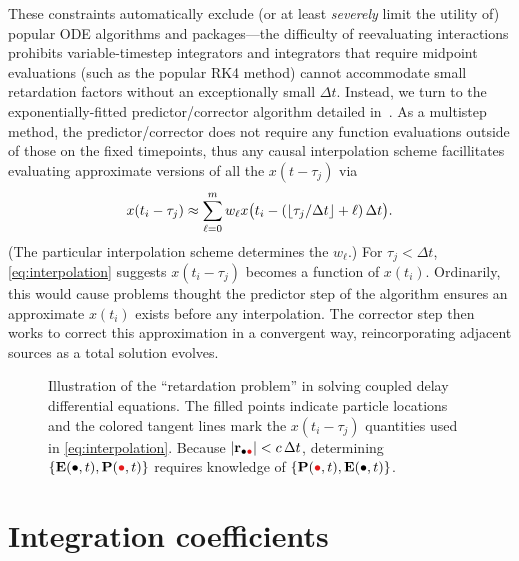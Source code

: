 These constraints automatically exclude (or at least \emph{severely} limit the utility of) popular ODE algorithms and packages---the difficulty of reevaluating interactions prohibits variable-timestep integrators and integrators that require midpoint evaluations (such as the popular RK4 method) cannot accommodate small retardation factors without an exceptionally small $\Delta t$.
Instead, we turn to the exponentially-fitted predictor/corrector algorithm detailed in~\cite{}.
As a multistep method, the predictor/corrector does not require any function evaluations outside of those on the fixed timepoints, thus any causal interpolation scheme facillitates evaluating approximate versions of all the $x(t - \tau_j)$ via
\begin{equation}
  x(t_i - \tau_j) \approx \sum_{\ell = 0}^m w_\ell x\qty\big(t_i - (\lfloor\tau_j/\Delta t\rfloor + \ell)\, \Delta t).
  \label{eq:interpolation}
\end{equation}
(The particular interpolation scheme determines the $w_\ell$.)
For $\tau_j < \Delta t$, \cref{eq:interpolation} suggests $x(t_i - \tau_j)$ becomes a function of $x(t_i)$.
Ordinarily, this would cause problems thought the predictor step of the algorithm ensures an approximate $x(t_i)$ exists before any interpolation.
The corrector step then works to correct this approximation in a convergent way, reincorporating adjacent sources as a total solution evolves.
  
\begin{figure}[]
  \centering
  \caption{\label{fig:retardation problem} Illustration of the ``retardation problem'' in solving coupled delay differential equations.
    The filled points indicate particle locations and the colored tangent lines mark the $x(t_i - \tau_j)$ quantities used in \cref{eq:interpolation}. 
    Because $\abs{\vb{r}_{\bullet \textcolor[RGB]{228,26,28}{\bullet}}} < c \, \Delta t$, determining $\qty{\vb{E}(\bullet, t),\vb{P}(\textcolor[RGB]{228,26,28}{\bullet}, t)}$ requires knowledge of $\qty{\vb{P}(\textcolor[RGB]{228,26,28}{\bullet}, t), \vb{E}(\bullet, t)}$.
  }
\end{figure}

\section{Integration coefficients}

